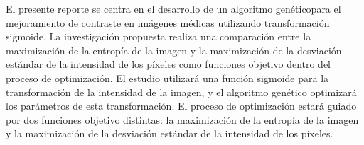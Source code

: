 El presente reporte se centra en el desarrollo de un algoritmo genéticopara el mejoramiento de contraste en imágenes médicas utilizando transformación sigmoide. La investigación propuesta realiza una comparación entre la maximización de la entropía de la imagen y la maximización de la desviación estándar de la intensidad de los píxeles como funciones objetivo dentro del proceso de optimización. El estudio utilizará una función sigmoide para la transformación de la intensidad de la imagen, y el algoritmo genético optimizará los parámetros de esta transformación. El proceso de optimización estará guiado por dos funciones objetivo distintas: la maximización de la entropía de la imagen y la maximización de la desviación estándar de la intensidad de los píxeles.
